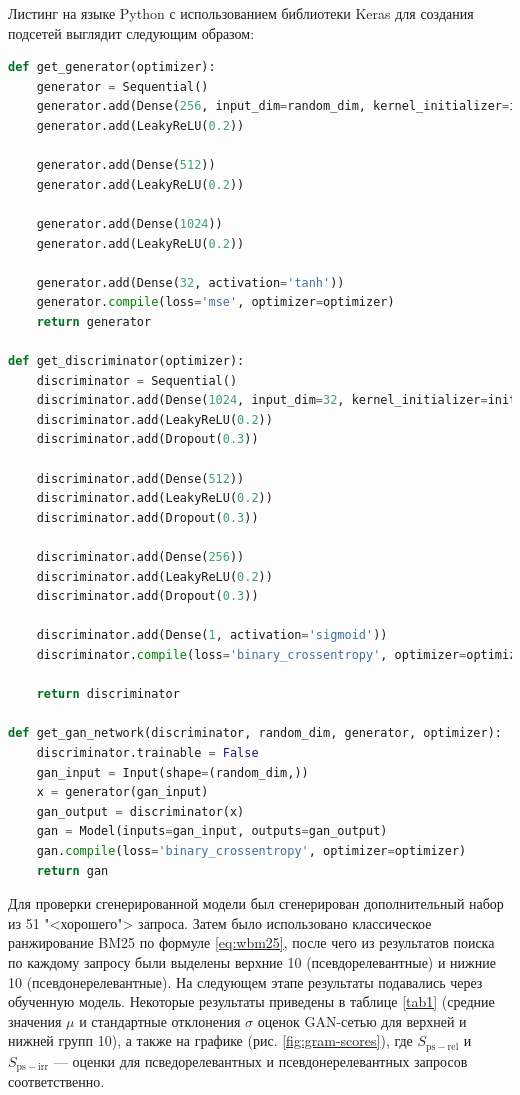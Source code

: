 Листинг на языке Python с использованием библиотеки Keras для создания подсетей выглядит следующим образом:
\begin{lstlisting}[language=python, breaklines=true]
def get_generator(optimizer):
    generator = Sequential()
    generator.add(Dense(256, input_dim=random_dim, kernel_initializer=initializers.RandomNormal(stddev=0.02)))
    generator.add(LeakyReLU(0.2))

    generator.add(Dense(512))
    generator.add(LeakyReLU(0.2))

    generator.add(Dense(1024))
    generator.add(LeakyReLU(0.2))

    generator.add(Dense(32, activation='tanh'))
    generator.compile(loss='mse', optimizer=optimizer)
    return generator

def get_discriminator(optimizer):
    discriminator = Sequential()
    discriminator.add(Dense(1024, input_dim=32, kernel_initializer=initializers.RandomNormal(stddev=0.02)))
    discriminator.add(LeakyReLU(0.2))
    discriminator.add(Dropout(0.3))

    discriminator.add(Dense(512))
    discriminator.add(LeakyReLU(0.2))
    discriminator.add(Dropout(0.3))

    discriminator.add(Dense(256))
    discriminator.add(LeakyReLU(0.2))
    discriminator.add(Dropout(0.3))

    discriminator.add(Dense(1, activation='sigmoid'))
    discriminator.compile(loss='binary_crossentropy', optimizer=optimizer)

    return discriminator

def get_gan_network(discriminator, random_dim, generator, optimizer):
    discriminator.trainable = False
    gan_input = Input(shape=(random_dim,))
    x = generator(gan_input)
    gan_output = discriminator(x)
    gan = Model(inputs=gan_input, outputs=gan_output)
    gan.compile(loss='binary_crossentropy', optimizer=optimizer)
    return gan 
\end{lstlisting}

Для проверки сгенерированной модели был сгенерирован дополнительный набор из 51 "<хорошего"> запроса. Затем 
было использовано классическое ранжирование BM25 по формуле \eqref{eq:wbm25}, после чего из результатов поиска 
по каждому запросу были выделены верхние 10 (псевдорелевантные) и нижние 10 (псевдонерелевантные).
На следующем этапе результаты подавались через обученную модель. Некоторые результаты приведены в таблице \ref{tab1}
(средние значения $\mu$ и стандартные отклонения $\sigma$ оценок GAN-сетью для верхней и нижней групп 10), а также
на графике (рис. \ref{fig:gram-scores}), где $S_{\mathrm{ps-rel}}$ и $S_{\mathrm{ps-irr}}$ --- оценки для
псведорелевантных и псевдонерелевантных запросов соответственно.

